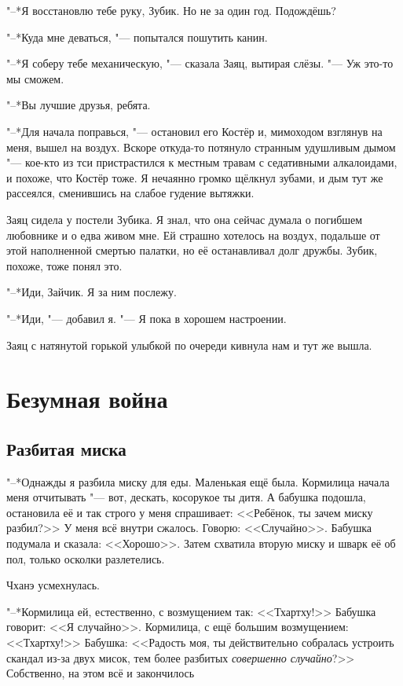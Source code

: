 "--*Я восстановлю тебе руку, Зубик.
Но не за один год.
Подождёшь?

"--*Куда мне деваться, "--- попытался пошутить канин.

"--*Я соберу тебе механическую, "--- сказала Заяц, вытирая слёзы.
"--- Уж это-то мы сможем.

"--*Вы лучшие друзья, ребята.

"--*Для начала поправься, "--- остановил его Костёр и, мимоходом взглянув на меня, вышел на воздух.
Вскоре откуда-то потянуло странным удушливым дымом "--- кое-кто из тси пристрастился к местным травам с седативными алкалоидами, и похоже, что Костёр тоже.
Я нечаянно громко щёлкнул зубами, и дым тут же рассеялся, сменившись на слабое гудение вытяжки.

Заяц сидела у постели Зубика.
Я знал, что она сейчас думала о погибшем любовнике и о едва живом мне.
Ей страшно хотелось на воздух, подальше от этой наполненной смертью палатки, но её останавливал долг дружбы.
Зубик, похоже, тоже понял это.

"--*Иди, Зайчик.
Я за ним послежу.

"--*Иди, "--- добавил я.
"--- Я пока в хорошем настроении.

Заяц с натянутой горькой улыбкой по очереди кивнула нам и тут же вышла.

\chapter{Безумная война}

\section{Разбитая миска}

"--*Однажды я разбила миску для еды.
Маленькая ещё была.
Кормилица начала меня отчитывать "--- вот, дескать, косорукое ты дитя.
А бабушка подошла, остановила её и так строго у меня спрашивает: <<Ребёнок, ты зачем миску разбил?>>
У меня всё внутри сжалось.
Говорю: <<Случайно>>.
Бабушка подумала и сказала: <<Хорошо>>.
Затем схватила вторую миску и шварк её об пол, только осколки разлетелись.

Чханэ усмехнулась.

"--*Кормилица ей, естественно, с возмущением так: <<Тхартху!>>
Бабушка говорит: <<Я случайно>>.
Кормилица, с ещё большим возмущением: <<Тхартху!>>
Бабушка: <<Радость моя, ты действительно собралась устроить скандал из-за двух мисок, тем более разбитых \textit{совершенно случайно}?>>
Собственно, на этом всё и закончилось\ldotst

